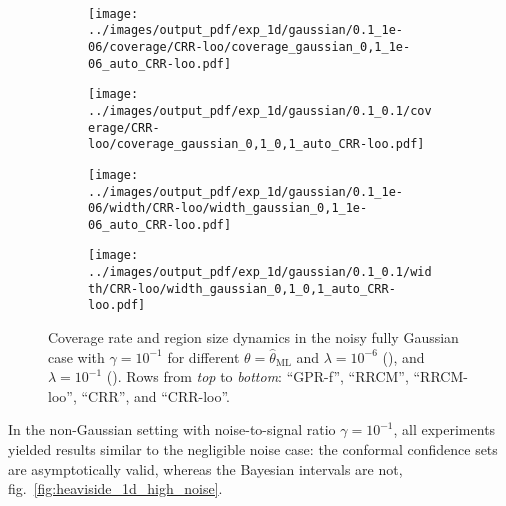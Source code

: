 \documentclass[conference]{IEEEtran}
\begin{document}
\begin{figure}
\begin{subfigure}[b]{0.25\linewidth}
  \end{subfigure}\\
  \begin{subfigure}[b]{0.25\linewidth}
    \texttt{[image: ../images/output\_pdf/exp\_1d/gaussian/0.1\_1e-06/coverage/CRR-loo/coverage\_gaussian\_0,1\_1e-06\_auto\_CRR-loo.pdf]}
    \caption{} \label{fig:gaussian_1d_high_noise_c3}
  \end{subfigure}%
  \begin{subfigure}[b]{0.25\linewidth}
    \texttt{[image: ../images/output\_pdf/exp\_1d/gaussian/0.1\_0.1/coverage/CRR-loo/coverage\_gaussian\_0,1\_0,1\_auto\_CRR-loo.pdf]}
    \caption{} \label{fig:gaussian_1d_high_noise_c4}
  \end{subfigure}%
  \begin{subfigure}[b]{0.25\linewidth}
    \texttt{[image: ../images/output\_pdf/exp\_1d/gaussian/0.1\_1e-06/width/CRR-loo/width\_gaussian\_0,1\_1e-06\_auto\_CRR-loo.pdf]}
    \caption{} \label{fig:gaussian_1d_high_noise_width_c3}
  \end{subfigure}%
  \begin{subfigure}[b]{0.25\linewidth}
    \texttt{[image: ../images/output\_pdf/exp\_1d/gaussian/0.1\_0.1/width/CRR-loo/width\_gaussian\_0,1\_0,1\_auto\_CRR-loo.pdf]}
    \caption{} \label{fig:gaussian_1d_high_noise_width_c4}
  \end{subfigure}
  \caption{Coverage rate and region size dynamics in the noisy fully Gaussian case
  with $\gamma=10^{-1}$ for different $\theta=\hat{\theta}_\text{ML}$ and $\lambda=10^{-6}$
  (), and $\lambda=10^{-1}$ ().
  Rows from \textit{top} to \textit{bottom}: ``GPR-f'', ``RRCM'', ``RRCM-loo'', ``CRR'', and ``CRR-loo''.}
  \label{fig:gaussian_1d_high_noise}
\end{figure}

In the non-Gaussian setting with noise-to-signal ratio $\gamma=10^{-1}$, all experiments
yielded results similar to the negligible noise case: the conformal confidence sets are
asymptotically valid, whereas the Bayesian intervals are not, fig.~\ref{fig:heaviside_1d_high_noise}.
\end{document}
